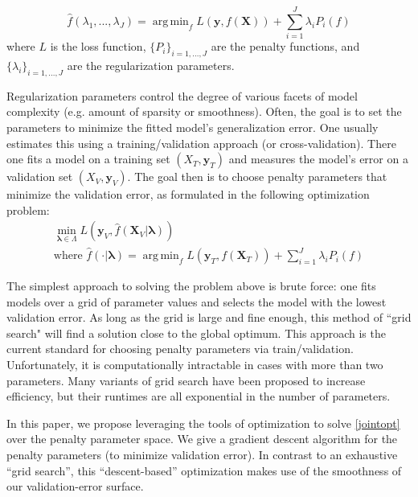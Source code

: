 \documentclass[10pt,letterpaper]{article}
\DeclareMathOperator*{\argmin}{arg\,min}
\begin{document}
\begin{equation} \label {eq:basic}
\hat f(\lambda_1, ..., \lambda_J) = \argmin_f L(\boldsymbol{y}, f (\boldsymbol{X})) + \sum\limits_{i=1}^J \lambda_i P_i(f)
\end{equation}
where $L$ is the loss function, $\{P_i\}_{i=1, ..., J}$ are the penalty functions, and $\{\lambda_i\}_{i=1, ..., J}$ are the regularization parameters.

Regularization parameters control the degree of various facets of model complexity (e.g. amount of sparsity or smoothness). Often, the goal is to set the parameters to minimize the fitted model's generalization error. One usually estimates this using a training/validation approach (or cross-validation). There one fits a model on a training set $(X_T, \boldsymbol y_T)$ and measures the model's error on a validation set $(X_V, \boldsymbol y_V)$. The goal then is to choose penalty parameters that minimize the validation error, as formulated in the following optimization problem:
\begin{equation}
\begin{array}{c}
\min_{\boldsymbol{\lambda} \in \Lambda} L(\boldsymbol{y}_V, \hat f (\boldsymbol{X}_V | \boldsymbol{\lambda})) \\
\text{where } \hat f(\cdot | \boldsymbol{\lambda}) = \argmin_f L(\boldsymbol{y}_T, f (\boldsymbol{X}_T)) + \sum\limits_{i=1}^J \lambda_i P_i(f)
\end{array}
\label{jointopt}
\end{equation}

The simplest approach to solving the problem above is brute force: one fits models over a grid of parameter values and selects the model with the lowest validation error. As long as the grid is large and fine enough, this method of ``grid search" will find a solution close to the global optimum. This approach is the current standard for choosing penalty parameters via train/validation. Unfortunately, it is computationally intractable in cases with more than two parameters. Many variants of grid search have been proposed to increase efficiency, but their runtimes are all exponential in the number of parameters.

In this paper, we propose leveraging the tools of optimization to solve \eqref{jointopt} over the penalty parameter space. We give a gradient descent algorithm for the penalty parameters (to minimize validation error). In contrast to an exhaustive ``grid search'', this ``descent-based'' optimization makes use of the smoothness of our validation-error surface. 
\end{document}
